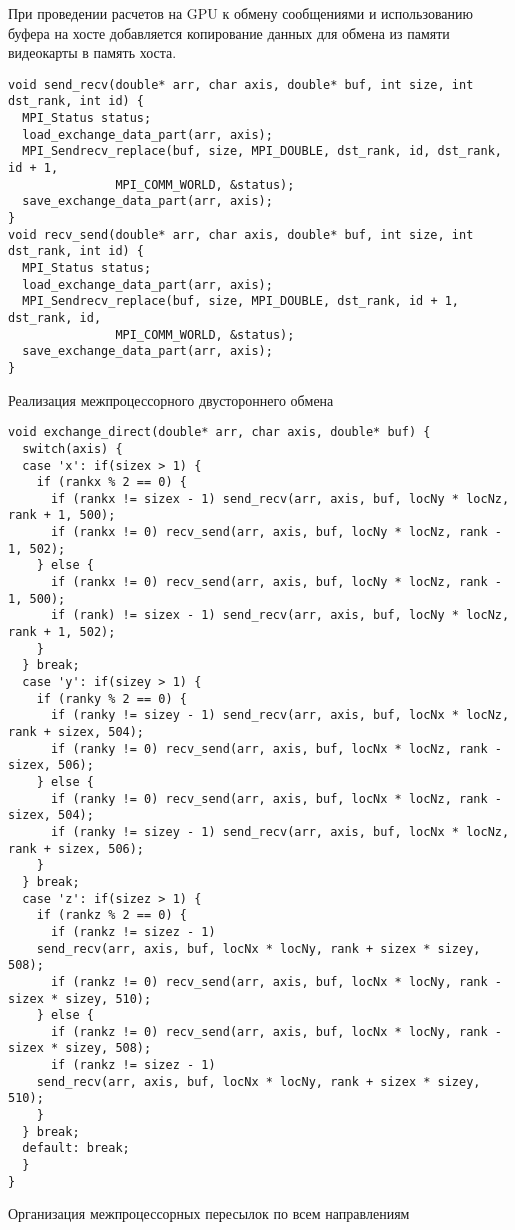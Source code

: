 При проведении расчетов на GPU к обмену сообщениями и использованию
буфера на хосте
добавляется копирование данных для обмена из памяти видеокарты
в память хоста.

\begin{listing}
\begin{verbatim}
void send_recv(double* arr, char axis, double* buf, int size, int dst_rank, int id) {
  MPI_Status status;
  load_exchange_data_part(arr, axis);
  MPI_Sendrecv_replace(buf, size, MPI_DOUBLE, dst_rank, id, dst_rank, id + 1,
		       MPI_COMM_WORLD, &status);
  save_exchange_data_part(arr, axis);
}
void recv_send(double* arr, char axis, double* buf, int size, int dst_rank, int id) {
  MPI_Status status;
  load_exchange_data_part(arr, axis);
  MPI_Sendrecv_replace(buf, size, MPI_DOUBLE, dst_rank, id + 1, dst_rank, id,
		       MPI_COMM_WORLD, &status);
  save_exchange_data_part(arr, axis);
}
\end{verbatim}
\caption{Реализация межпроцессорного двустороннего обмена}
\label{lst_exchange}
\end{listing}
\begin{listing}
\begin{verbatim}
void exchange_direct(double* arr, char axis, double* buf) {
  switch(axis) {
  case 'x': if(sizex > 1) {
    if (rankx % 2 == 0) {
      if (rankx != sizex - 1) send_recv(arr, axis, buf, locNy * locNz, rank + 1, 500);
      if (rankx != 0) recv_send(arr, axis, buf, locNy * locNz, rank - 1, 502);
    } else {
      if (rankx != 0) recv_send(arr, axis, buf, locNy * locNz, rank - 1, 500);
      if (rank) != sizex - 1) send_recv(arr, axis, buf, locNy * locNz, rank + 1, 502);
    }
  } break;
  case 'y': if(sizey > 1) {
    if (ranky % 2 == 0) {
      if (ranky != sizey - 1) send_recv(arr, axis, buf, locNx * locNz, rank + sizex, 504);
      if (ranky != 0) recv_send(arr, axis, buf, locNx * locNz, rank - sizex, 506);
    } else {
      if (ranky != 0) recv_send(arr, axis, buf, locNx * locNz, rank - sizex, 504);
      if (ranky != sizey - 1) send_recv(arr, axis, buf, locNx * locNz, rank + sizex, 506);
    }
  } break;
  case 'z': if(sizez > 1) {
    if (rankz % 2 == 0) {
      if (rankz != sizez - 1)
	send_recv(arr, axis, buf, locNx * locNy, rank + sizex * sizey, 508);
      if (rankz != 0) recv_send(arr, axis, buf, locNx * locNy, rank - sizex * sizey, 510);
    } else {
      if (rankz != 0) recv_send(arr, axis, buf, locNx * locNy, rank - sizex * sizey, 508);
      if (rankz != sizez - 1)
	send_recv(arr, axis, buf, locNx * locNy, rank + sizex * sizey, 510);
    }
  } break;
  default: break;
  }
}
\end{verbatim}
\caption{Организация межпроцессорных пересылок по всем направлениям}
\label{lst_exchanges}
\end{listing}


